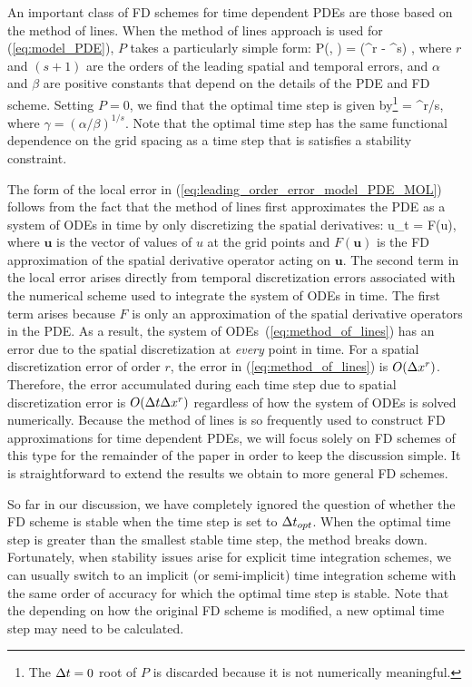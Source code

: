 \documentclass[oneeqnum,onefignum,onetabnum,onethmnum]{siamltex}
\begin{document}
An important class of FD schemes for time dependent PDEs are those based
on the method of lines.   When the method of lines approach is used for 
(\ref{eq:model_PDE}), $P$ takes a particularly simple 
form:
\beq
  P(\dx, \dt) = (\alpha \dx^r - \beta \dt^s) \dt,
  \label{eq:leading_order_error_model_PDE_MOL}
\eeq
where $r$ and $(s+1)$ are the orders of the leading spatial and temporal 
errors, and $\alpha$ and $\beta$ are positive constants that depend on the 
details of the PDE and FD scheme.  Setting $P = 0$, we find that the optimal 
time step is given by\footnote{The $\Delta t = 0$ root of $P$ is discarded 
because it is not numerically meaningful.}
\beq
  \dto = \gamma \dx^{r/s},
  \label{eq:optimal_time_step}
\eeq
where $\gamma = (\alpha/\beta)^{1/s}$.  Note that the optimal time step 
has the same functional dependence on the grid spacing as a time step 
that is satisfies a stability constraint.  

The form of the local error in 
(\ref{eq:leading_order_error_model_PDE_MOL}) follows from the fact 
that the method of lines first approximates the PDE as a system of ODEs in 
time by only discretizing the spatial derivatives: 
\beq
{\mathbf u}_t = F({\mathbf u}),
\label{eq:method_of_lines}
\eeq
where ${\mathbf u}$ is the vector of values of $u$ at the grid points and
$F({\mathbf u})$ is the FD approximation of the spatial derivative 
operator acting on ${\mathbf u}$.  The second term in the local error arises 
directly from temporal discretization errors associated with the numerical 
scheme used to integrate the system of ODEs in time.  The first term arises 
because $F$ is only an approximation of the spatial derivative operators in 
the PDE.  As a result, the system of ODEs~(\ref{eq:method_of_lines}) has an 
error due to the spatial discretization at \emph{every} point in time.  For 
a spatial discretization error of order $r$, the error in 
(\ref{eq:method_of_lines}) is $O(\Delta x^r)$.  Therefore, the error 
accumulated during each time step due to spatial discretization error is 
$O(\Delta t \Delta x^r)$ regardless of how the system of ODEs is solved 
numerically.  Because the method of lines is so frequently used to construct FD 
approximations for time dependent PDEs, we will focus solely on FD schemes 
of this type for the remainder of the paper in order to keep the discussion 
simple.  It is straightforward to extend the results we obtain to more general 
FD schemes. 

So far in our discussion, we have completely ignored the question of whether 
the FD scheme is stable when the time step is set to $\Delta t_{opt}$.  When
the optimal time step is greater than the smallest stable time step, the 
method breaks down.  Fortunately, when stability issues arise for explicit 
time integration schemes, we can usually switch to an implicit (or 
semi-implicit) time integration scheme with the same order of accuracy for 
which the optimal time step is stable.  Note that the depending on how
the original FD scheme is modified, a new optimal time step may need to be 
calculated.  
\end{document}
